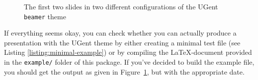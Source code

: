 \documentclass[a4paper,10pt]{article}
\theoremstyle{definition}
\newlength\figurewidth
\begin{document}
\begin{figure}[t]
  \caption{The first two slides in two different configurations of the UGent \texttt{beamer} theme}
  \label{figure:example-output}
\end{figure}

If everything seems okay, you can check whether you can actually produce a presentation with the UGent theme by either creating a minimal test file (see Listing \ref{listing:minimal-example}) or by compiling the \LaTeX-document provided in the \verb!example/! folder of this package. If you've decided to build the example file, you should get the output as given in Figure~\ref{figure:example-output}, but with the appropriate date.
\end{document}
